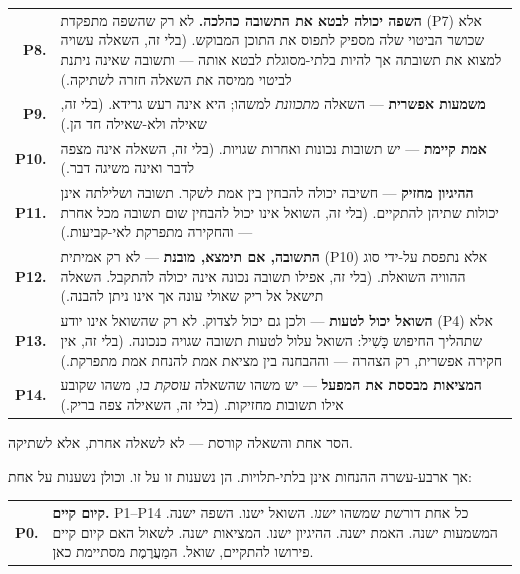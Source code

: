 \documentclass[10pt, openany, oneside]{book}
\renewcommand{\footnotesize}{\fontsize{8.5}{11}\selectfont}
\begin{document}
{\footnotesize
\noindent\begin{tabular}{r p{}}
\textbf{P8.} & \textbf{השפה יכולה לבטא את התשובה כהלכה.} לא רק שהשפה מתפקדת (P7) אלא שכושר הביטוי שלה מספיק לתפוס את התוכן המבוקש. (בלי זה, השאלה עשויה למצוא את תשובתה אך להיות בלתי-מסוגלת לבטא אותה — ותשובה שאינה ניתנת לביטוי ממיסה את השאלה חזרה לשתיקה.) \\[0.3em]
\textbf{P9.} & \textbf{משמעות אפשרית} — השאלה \textit{מתכוונת} למשהו; היא אינה רעש גרידא. (בלי זה, שאילה ולא-שאילה חד הן.) \\[0.3em]
\textbf{P10.} & \textbf{אמת קיימת} — יש תשובות נכונות ואחרות שגויות. (בלי זה, השאלה אינה מצפה לדבר ואינה משיגה דבר.) \\[0.3em]
\textbf{P11.} & \textbf{ההיגיון מחזיק} — חשיבה יכולה להבחין בין אמת לשקר. תשובה ושלילתה אינן יכולות שתיהן להתקיים. (בלי זה, השואל אינו יכול להבחין שום תשובה מכל אחרת — והחקירה מתפרקת לאי-קביעות.) \\[0.3em]
\textbf{P12.} & \textbf{התשובה, אם תימצא, מובנת} — לא רק אמיתית (P10) אלא נתפסת על-ידי סוג ההוויה השואלת. (בלי זה, אפילו תשובה נכונה אינה יכולה להתקבל. השאלה תישאל אל ריק שאולי עונה אך אינו ניתן להבנה.) \\[0.3em]
\textbf{P13.} & \textbf{השואל יכול לטעות} — ולכן גם יכול לצדוק. לא רק שהשואל אינו יודע (P4) אלא שתהליך החיפוש כָּשִׁיל: השואל עלול לטעות תשובה שגויה כנכונה. (בלי זה, אין חקירה אפשרית, רק הצהרה — וההבחנה בין מציאת אמת להנחת אמת מתפרקת.) \\[0.3em]
\textbf{P14.} & \textbf{המציאות מבססת את המפעל} — יש משהו שהשאלה \textit{עוסקת בו}, משהו שקובע אילו תשובות מחזיקות. (בלי זה, השאילה צפה בריק.) \\[0.3em]
\end{tabular}
}

\vspace{0.8em}

\noindent הסר אחת והשאלה קורסת — לא לשאלה אחרת, אלא לשתיקה.

אך ארבע-עשרה ההנחות אינן בלתי-תלויות. הן נשענות זו על זו. וכולן נשענות על אחת:

\vspace{0.5em}

\noindent\begin{tabular}{r p{}}
\textbf{P0.} & \textbf{קיום קיים.} P1–P14 כל אחת דורשת שמשהו \textit{ישנו}. השואל ישנו. השפה ישנה. המשמעות ישנה. האמת ישנה. ההיגיון ישנו. המציאות ישנה. לשאול האם קיום קיים פירושו להתקיים, שואל. המַעֲרֶמֶת מסתיימת כאן. \\[0.3em]
\end{tabular}
\end{document}
